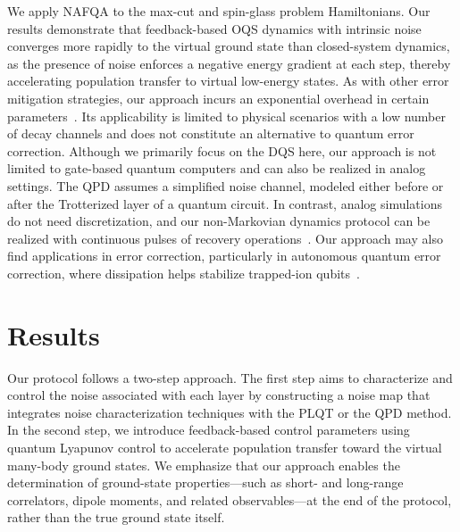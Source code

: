\documentclass[10pt, superscriptaddress,aps,pra,twocolumn,showpacs,nofootinbib, longbibliography, notitlepage,floatfix]{revtex4-2}
\begin{document}
We apply NAFQA to the max-cut and spin-glass problem Hamiltonians. Our results demonstrate that feedback-based OQS dynamics with intrinsic noise converges more rapidly to the virtual ground state than closed-system dynamics, as the presence of noise enforces a negative energy gradient at each step, thereby accelerating population transfer to virtual low-energy states. As with other error mitigation strategies, our approach incurs an exponential overhead in certain parameters~\cite{Takagi2022}. Its applicability is limited to physical scenarios with a low number of decay channels and does not constitute an alternative to quantum error correction. Although we primarily focus on the DQS here, our approach is not limited to gate-based quantum computers and can also be realized in analog settings. The QPD assumes a simplified noise channel, modeled either before or after the Trotterized layer of a quantum circuit. In contrast, analog simulations do not need discretization, and our non-Markovian dynamics protocol can be realized with continuous pulses of recovery operations~\cite{Jinzhao_Sun_PhysRevApplied_2021}. Our approach may also find applications in error correction, particularly in autonomous quantum error correction, where dissipation helps stabilize trapped-ion qubits~\cite{Reiter_Zoller_nat_comm_2017}.

\section*{Results}
Our protocol follows a two-step approach. The first step aims to characterize and control the noise associated with each layer by constructing a noise map that integrates noise characterization techniques with the PLQT or the QPD method. In the second step, we introduce feedback-based control parameters using quantum Lyapunov control to {accelerate population transfer toward the virtual many-body ground states}. We emphasize that our approach enables the determination of ground-state properties—such as short- and long-range correlators, dipole moments, and related observables—at the end of the protocol, rather than the true ground state itself.
\end{document}
